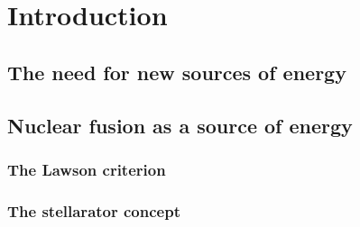 \documentclass[my_thesis.tex]{subfiles}
\begin{document}
\cleardoublepage
\chapter*{Introduction}

\section{The need for new sources of energy}



\section{Nuclear fusion as a source of energy}


\subsection{The Lawson criterion}


\subsection{The stellarator concept}
\end{document}
